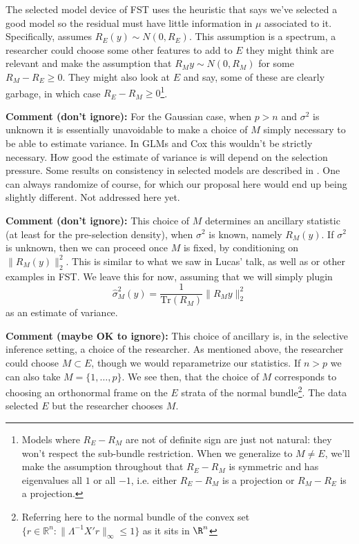 \documentclass{article}
\begin{document}
        The selected model device of FST uses the heuristic that says
        we've selected a good model so the residual must have little
        information in $\mu$ associated to it.  Specifically, assumes
        $R_E(y) \sim N(0, R_E)$. This assumption is a spectrum, a
        researcher could choose some other features to add to $E$ they
        might think are relevant and make the assumption that $R_{M}y
        \sim N(0, R_M)$ for some $R_{M}-R_E \geq 0$. They might also
        look at $E$ and say, some of these are clearly garbage, in
        which case $R_E-R_M \geq 0$\footnote{Models where $R_E-R_M$ are not
        of definite sign are just not natural: they won't respect the
        sub-bundle restriction. When we generalize to $M \neq E$, we'll make the
        assumption throughout that $R_E-R_M$ is symmetric and has eigenvalues all
        $1$ or all $-1$, i.e. either $R_E-R_M$ is a projection or $R_M-R_E$ is a projection.}.

        {\bf Comment (don't ignore):} For the Gaussian case, when $p >
        n$ and $\sigma^2$ is unknown it is essentially unavoidable to
        make a choice of $M$ simply necessary to be able to estimate
        variance. In GLMs and Cox this wouldn't be strictly necessary. How good
        the estimate of variance is will depend on the selection pressure. Some
        results on consistency in selected models are described in \cite{xiaoying:randomized}.
        One can always randomize of course, for which our proposal here would
        end up being slightly different. Not addressed here yet.

        {\bf Comment (don't ignore):} This choice of $M$ determines an
        ancillary statistic (at least for the pre-selection density),
        when $\sigma^2$ is known, namely $R_M(y)$. If $\sigma^2$ is
        unknown, then we can proceed once $M$ is fixed, by
        conditioning on $\|R_{M}(y)\|^2_2$. This is similar to what we
        saw in Lucas' talk, as well as \cite{sqrtlasso} or other
        examples in FST.  We leave this for now, assuming that we will
        simply plugin
        $$ \hat{\sigma}^2_{M}(y) = \frac{1}{\text{Tr}(R_{M})}
        \|R_{M}y\|^2_2
        $$ as an estimate of variance.

        {\bf Comment (maybe OK to ignore):} This choice of ancillary
        is, in the selective inference setting, a choice of the
        researcher. As mentioned above, the researcher could choose $M
        \subset E$, though we would reparametrize our statistics. If
        $n>p$ we can also take $M=\{1, \dots, p\}$.  We see then, that
        the choice of $M$ corresponds to choosing an orthonormal frame
        on the $E$ strata of the normal bundle\footnote{Referring here
        to the normal bundle of the convex set $\{r \in \mathbb{R}^n:
        \|\Lambda^{-1}X'r\|_{\infty} \leq 1\}$ as it sits in $\R^n$}. The data
        selected $E$ but the researcher chooses $M$.
\end{document}
